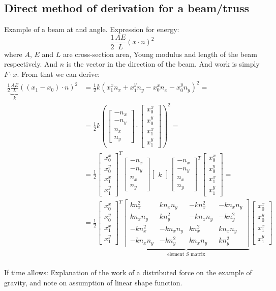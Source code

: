 \documentclass{article}
\newcommand{\mat}[1]{\left[\begin{matrix}#1\end{matrix}\right]}
\begin{document}
\subsection{Direct method of derivation for a beam/truss}

Example of a beam at and angle. Expression for energy:
\[\frac{1}{2}\frac{AE}{L}(x\cdot n)^2\]
where $A$, $E$ and $L$ are cross-section area, Young modulus and length of the beam respectively. And $n$ is the vector in the direction of the beam. And work is simply $F\cdot x$. From that we can derive:
\begin{align*}\frac{1}{2}\underbrace{\frac{AE}{L}}_k((x_1-x_0)\cdot n)^2 &= \frac{1}{2}k(x^x_1n_x+x^y_1n_y-x^x_0n_x-x^y_0n_y)^2 =\\
&= \frac{1}{2}k\left(\mat{-n_x\\-n_y\\n_x\\n_y}\cdot\mat{x^x_0\\x^y_0\\x^x_1\\x^y_1}\right)^2 =\\
&= \frac{1}{2}\mat{x^x_0\\x^y_0\\x^x_1\\x^y_1}^T\mat{-n_x\\-n_y\\n_x\\n_y}\mat{k}\mat{-n_x\\-n_y\\n_x\\n_y}^T\mat{x^x_0\\x^y_0\\x^x_1\\x^y_1} =\\
&= \frac{1}{2}\mat{x^x_0\\x^y_0\\x^x_1\\x^y_1}^T\underbrace{\mat{kn_x^2 & kn_xn_y & -kn_x^2 & -kn_xn_y\\kn_xn_y & kn_y^2 & -kn_xn_y & -kn_y^2\\-kn_x^2 & -kn_xn_y & kn_x^2 & kn_xn_y\\-kn_xn_y & -kn_y^2 & kn_xn_y & kn_y^2}}_\text{element $S$ matrix}\mat{x^x_0\\x^y_0\\x^x_1\\x^y_1}\\
\end{align*}

If time allows:
Explanation of the work of a distributed force on the example of gravity, and note on assumption of linear shape function.
\newpage
\end{document}

